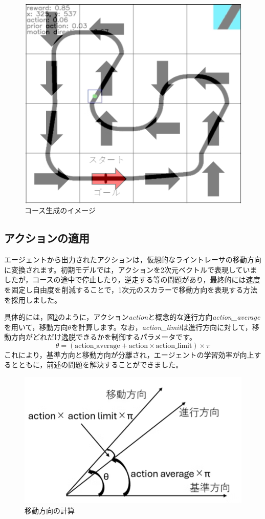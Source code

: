 \begin{figure}[h]
  \centering
  \includegraphics[width=0.7\hsize]{line-tracer/fig/image3.png}
  \caption{コース生成のイメージ}
  \label{fig:image3}
\end{figure}

\subsection{アクションの適用}
エージェントから出力されたアクションは，仮想的なライントレーサの移動方向に変換されます。初期モデルでは，アクションを2次元ベクトルで表現していましたが，コースの途中で停止したり，逆走する等の問題があり，最終的には速度を固定し自由度を削減することで，1次元のスカラーで移動方向を表現する方法を採用しました。

具体的には，図\ref{fig:image4}のように，アクション\textit{action}と概念的な進行方向\textit{action\_average}を用いて，移動方向$\theta$を計算します。なお，\textit{action\_limit}は進行方向に対して，移動方向がどれだけ逸脱できるかを制御するパラメータです。
\[
\theta = (\text{action\_average} + \text{action} \times \text{action\_limit}) \times \pi
\]
これにより，基準方向と移動方向が分離され，エージェントの学習効率が向上するとともに，前述の問題を解決することができました。
\begin{figure}[h]
  \centering
  \includegraphics[width=0.7\hsize]{line-tracer/fig/image4.png}
  \caption{移動方向の計算}
  \label{fig:image4}
\end{figure}

